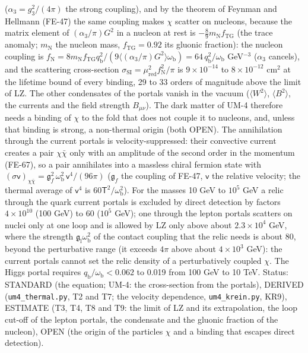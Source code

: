 \documentclass[
  10pt,
]{article}
\begin{document}
(\(\alpha_3 = g_3^2/(4\pi)\) the strong coupling), and by the theorem of
Feynman and Hellmann (FE-47) the same coupling makes \(\chi\) scatter on
nucleons, because the matrix element of \((\alpha_3/\pi)G^2\) in a
nucleon at rest is \(-\frac89m_{\mathrm{N}}f_{\mathrm{TG}}\) (the trace
anomaly; \(m_{\mathrm{N}}\) the nucleon mass, \(f_{\mathrm{TG}} = 0.92\)
its gluonic fraction): the nucleon coupling is
\(f_{\mathrm{N}} = 8m_{\mathrm{N}}f_{\mathrm{TG}}q_{\mathrm{b}}^2/(9\langle(\alpha_3/\pi)G^2\rangle\omega_{\mathrm{b}}) = 64\,q_{\mathrm{b}}^2/\omega_{\mathrm{b}}\)
GeV\(^{-3}\) (\(\alpha_3\) cancels), and the scattering cross-section
\(\sigma_{\mathrm{SI}} = \mu_{\mathrm{red}}^2f_{\mathrm{N}}^2/\pi\) is
\(9\times10^{-14}\) to \(8\times10^{-12}\) cm\(^2\) at the lifetime
bound of every binding, 29 to 33 orders of magnitude above the limit of
LZ. The other condensates of the portals vanish in the vacuum
(\(\langle W^2\rangle\), \(\langle B^2\rangle\), the currents and the
field strength \(B_{\mu\nu}\)). The dark matter of UM-4 therefore needs
a binding of \(\chi\) to the fold that does not couple it to nucleons,
and, unless that binding is strong, a non-thermal origin (both OPEN).
The annihilation through the current portals is velocity-suppressed:
their convective current creates a pair \(\chi\bar\chi\) only with an
amplitude of the second order in the momentum (FE-67), so a pair
annihilates into a massless chiral fermion state with
\((\sigma\mathsf{v})_{\chi\bar\chi} = \mathfrak{g}_{f}^2\,\omega_{\mathrm{b}}^2\,\mathsf{v}^4/(96\pi)\)
(\(\mathfrak{g}_{f}\) the coupling of FE-47, \(\mathsf{v}\) the relative
velocity; the thermal average of \(\mathsf{v}^4\) is
\(60\mathsf{T}^2/\omega_{\mathrm{b}}^2\)). For the masses 10 GeV to
\(10^5\) GeV a relic through the quark current portals is excluded by
direct detection by factors \(4\times10^{10}\) (100 GeV) to 60 (\(10^5\)
GeV); one through the lepton portals scatters on nuclei only at one loop
and is allowed by LZ only above about \(2.3\times10^4\) GeV, where the
strength \(\mathfrak{g}_{\mathrm{l}}\omega_{\mathrm{b}}^2\) of the
contact coupling that the relic needs is about 80, beyond the
perturbative range (it exceeds \(4\pi\) above about \(4\times10^3\)
GeV): the current portals cannot set the relic density of a
perturbatively coupled \(\chi\). The Higgs portal requires
\(q_{\mathrm{b}}/\omega_{\mathrm{b}} < 0.062\) to 0.019 from 100 GeV to
10 TeV. Status: STANDARD (the equation; UM-4: the cross-section from the
portals), DERIVED (\texttt{um4\_thermal.py}, T2 and T7; the velocity
dependence, \texttt{um4\_krein.py}, KR9), ESTIMATE (T3, T4, T8 and T9:
the limit of LZ and its extrapolation, the loop cut-off of the lepton
portals, the condensate and the gluonic fraction of the nucleon), OPEN
(the origin of the particles \(\chi\) and a binding that escapes direct
detection).
\end{document}
